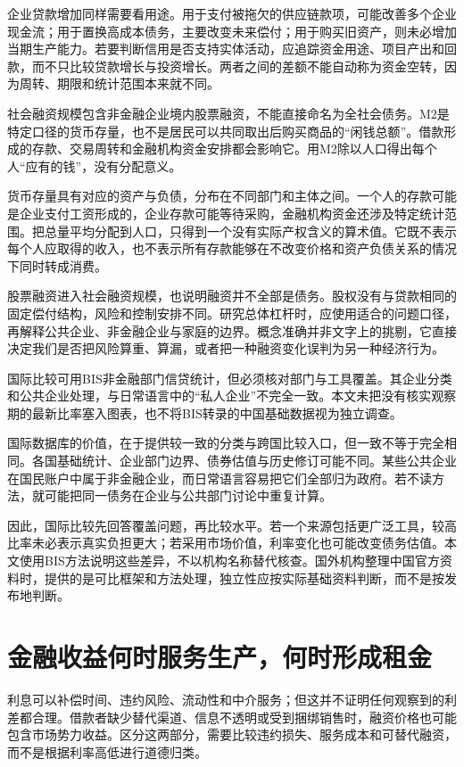 \documentclass[UTF8,fontset=fandol,zihao=-4,oneside,openany]{ctexbook}
\begin{document}
企业贷款增加同样需要看用途。用于支付被拖欠的供应链款项，可能改善多个企业现金流；用于置换高成本债务，主要改变未来偿付；用于购买旧资产，则未必增加当期生产能力。若要判断信用是否支持实体活动，应追踪资金用途、项目产出和回款，而不只比较贷款增长与投资增长。两者之间的差额不能自动称为资金空转，因为周转、期限和统计范围本来就不同。

社会融资规模包含非金融企业境内股票融资，不能直接命名为全社会债务。M2是特定口径的货币存量，也不是居民可以共同取出后购买商品的“闲钱总额”。借款形成的存款、交易周转和金融机构资金安排都会影响它。用M2除以人口得出每个人“应有的钱”，没有分配意义。

\label{arg:P105}
货币存量具有对应的资产与负债，分布在不同部门和主体之间。一个人的存款可能是企业支付工资形成的，企业存款可能等待采购，金融机构资金还涉及特定统计范围。把总量平均分配到人口，只得到一个没有实际产权含义的算术值。它既不表示每个人应取得的收入，也不表示所有存款能够在不改变价格和资产负债关系的情况下同时转成消费。

股票融资进入社会融资规模，也说明融资并不全部是债务。股权没有与贷款相同的固定偿付结构，风险和控制安排不同。研究总体杠杆时，应使用适合的问题口径，再解释公共企业、非金融企业与家庭的边界。概念准确并非文字上的挑剔，它直接决定我们是否把风险算重、算漏，或者把一种融资变化误判为另一种经济行为。

国际比较可用BIS非金融部门信贷统计，但必须核对部门与工具覆盖。其企业分类和公共企业处理，与日常语言中的“私人企业”不完全一致。本文未把没有核实观察期的最新比率塞入图表，也不将BIS转录的中国基础数据视为独立调查。\cite{BISCredit}

\label{arg:P106}
国际数据库的价值，在于提供较一致的分类与跨国比较入口，但一致不等于完全相同。各国基础统计、企业部门边界、债券估值与历史修订可能不同。某些公共企业在国民账户中属于非金融企业，而日常语言容易把它们全部归为政府。若不读方法，就可能把同一债务在企业与公共部门讨论中重复计算。

因此，国际比较先回答覆盖问题，再比较水平。若一个来源包括更广泛工具，较高比率未必表示真实负担更大；若采用市场价值，利率变化也可能改变债务估值。本文使用BIS方法说明这些差异，不以机构名称替代核查。国外机构整理中国官方资料时，提供的是可比框架和方法处理，独立性应按实际基础资料判断，而不是按发布地判断。

\section{金融收益何时服务生产，何时形成租金}
利息可以补偿时间、违约风险、流动性和中介服务；但这并不证明任何观察到的利差都合理。借款者缺少替代渠道、信息不透明或受到捆绑销售时，融资价格也可能包含市场势力收益。区分这两部分，需要比较违约损失、服务成本和可替代融资，而不是根据利率高低进行道德归类。
\end{document}
